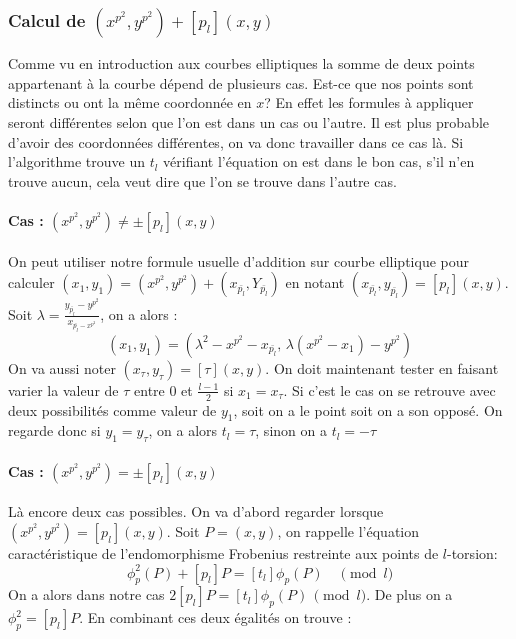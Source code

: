 \documentclass[12pt]{article}
\begin{document}
\subsubsection{Calcul de $(x^{p^2}, y^{p^2}) + [p_l](x,y)$}

Comme vu en introduction aux courbes elliptiques la somme de deux points appartenant à la courbe dépend de plusieurs cas. Est-ce que nos points sont distincts ou ont la même coordonnée en $x$? En effet les formules à appliquer seront différentes selon que l'on est dans un cas ou l'autre. Il est plus probable d'avoir des coordonnées différentes, on va donc travailler dans ce cas là. Si l'algorithme trouve un $t_l$ vérifiant l'équation on est dans le bon cas, s'il n'en trouve aucun, cela veut dire que l'on se trouve dans l'autre cas.
\paragraph*{Cas : $(x^{p^2}, y^{p^2}) \ne \pm [p_l](x,y)$}

On peut utiliser notre formule usuelle d'addition sur courbe elliptique pour calculer $(x_1, y_1) = (x^{p^2}, y^{p^2}) + (x_{\bar{p_l}}, Y_{\bar{p_l}})$ en notant $(x_{\bar{p_l}}, y_{\bar{p_l}}) =  [p_l](x,y)$. 
\newline
Soit $\lambda = \frac{y_{\bar{p_l}} - y^{p^2}}{x_{\bar{p_l} - x^{p^2}}}$, on a alors :
\begin{equation}
(x_1, y_1) = (\lambda^2 - x^{p^2} - x_{\bar{p_l}}, \, \lambda (x^{p^2} - x_1) -  y^{p^2})
\end{equation}
On va aussi noter $(x_{\tau}, y_{\tau}) =  [\tau](x,y)$. On doit maintenant tester en faisant varier la valeur de $\tau$ entre $0$ et $\frac{l-1}{2}$ si $x_1 = x_{\tau}$. Si c'est le cas on se retrouve avec deux possibilités comme valeur de $y_1$, soit on a le point soit on a son opposé. On regarde donc si $y_1 = y_{\tau}$, on a alors $t_l = \tau$, sinon on a $t_l = - \tau$

\paragraph*{Cas : $(x^{p^2}, y^{p^2}) = \pm [p_l](x,y)$}
Là encore deux cas possibles. On va d'abord regarder lorsque $(x^{p^2}, y^{p^2}) = [p_l](x,y)$. 
\newline
Soit $P=(x,y)$, on rappelle l’équation caractéristique de l'endomorphisme Frobenius restreinte aux points de $l$-torsion: 
\begin{equation}
\phi_p^2(P)  + [p_l]P = [t_{l}] \phi_p(P) \quad \pmod{l}
\end{equation}
On a alors dans notre cas $2[p_l]P = [t_{l}] \phi_p(P) \, \pmod{l}$. De plus on a $\phi_p^2 = [p_l]P$. En combinant ces deux égalités on trouve :
\end{document}
